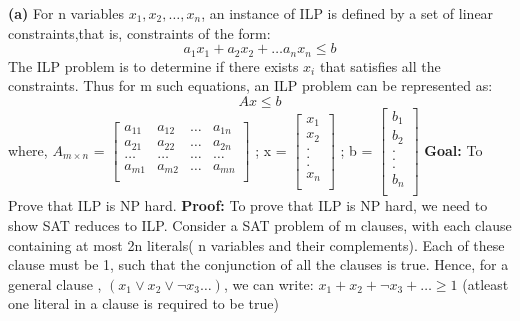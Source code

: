 \documentclass{article}
\renewcommand\part[1]{\vspace{.10in}\textbf{(#1)}}
\begin{document}
\part{a} For n variables $x_{1}, x_{2}, \dots , x_{n}$, an instance of ILP is defined by a set of linear constraints,that is, constraints of the form: \newline
\[ a_{1}x_{1} + a_{2}x_{2} + \dots a_{n}x_{n} \leq b\]
The ILP problem is to determine if there exists $x_{i}$ that satisfies all the constraints.
Thus for m such equations, an ILP problem can be represented as: \newline
\[Ax \leq b\]
where, \newline
$A_{m \times n}$ = $\begin{bmatrix}
a_{11} & a_{12} & \dots & a_{1n} \\
a_{21} & a_{22} & \dots & a_{2n} \\
\dots & \dots & \dots & \dots \\
a_{m1} & a_{m2} & \dots & a_{mn} \\ 
\end{bmatrix}$
;  x = $\begin{bmatrix}
x_{1} \\ x_{2} \\ . \\ . \\ . \\ x_{n} \\
\end{bmatrix}$
; b = $\begin{bmatrix}
b_{1} \\ b_{2} \\ . \\ . \\ . \\ b_{n} \\
\end{bmatrix}$ \newline
\textbf {Goal:} To Prove that ILP is NP hard. \newline
\textbf{Proof:} To prove that ILP is NP hard, we need to show SAT reduces to ILP. \newline
Consider a SAT problem of m clauses, with each clause containing at most 2n literals( n variables and their complements). Each of these clause must be 1, such that the conjunction of all the clauses is true. Hence, for a general clause , $(x_{1} \vee x_{2} \vee \neg x_{3} \dots )$, we can write:\newline
\hspace*{1cm} $x_{1} + x_{2} + \neg x_{3} + \dots \geq 1$ (atleast one literal in a clause is required to be true) \newline
\end{document}
